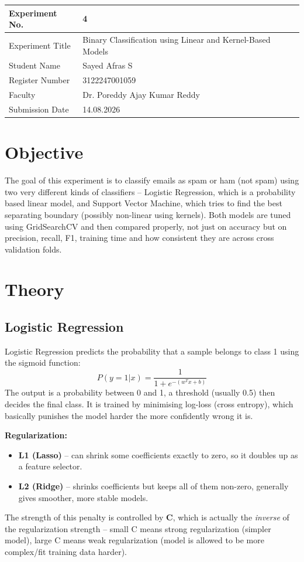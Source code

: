 \documentclass[12pt,a4paper]{article}
\begin{document}
\begin{tabular}{|p{4cm}|p{11cm}|}
\hline
Experiment No. & 4 \\ \hline
Experiment Title & Binary Classification using Linear and Kernel-Based Models \\ \hline
Student Name & Sayed Afras S \\ \hline
Register Number & 3122247001059 \\ \hline
Faculty & Dr. Poreddy Ajay Kumar Reddy \\ \hline
Submission Date & 14.08.2026 \\ \hline
\end{tabular}

\section{Objective}
The goal of this experiment is to classify emails as spam or ham (not spam) using two very different kinds of classifiers -- Logistic Regression, which is a probability based linear model, and Support Vector Machine, which tries to find the best separating boundary (possibly non-linear using kernels). Both models are tuned using GridSearchCV and then compared properly, not just on accuracy but on precision, recall, F1, training time and how consistent they are across cross validation folds.

\section{Theory}

\subsection*{Logistic Regression}
Logistic Regression predicts the probability that a sample belongs to class 1 using the sigmoid function:
\[
P(y=1|x) = \frac{1}{1 + e^{-(w^Tx + b)}}
\]
The output is a probability between 0 and 1, a threshold (usually 0.5) then decides the final class. It is trained by minimising log-loss (cross entropy), which basically punishes the model harder the more confidently wrong it is.

\textbf{Regularization:}
\begin{itemize}
\item \textbf{L1 (Lasso)} -- can shrink some coefficients exactly to zero, so it doubles up as a feature selector.
\item \textbf{L2 (Ridge)} -- shrinks coefficients but keeps all of them non-zero, generally gives smoother, more stable models.
\end{itemize}
The strength of this penalty is controlled by \textbf{C}, which is actually the \textit{inverse} of the regularization strength -- small C means strong regularization (simpler model), large C means weak regularization (model is allowed to be more complex/fit training data harder).
\end{document}
